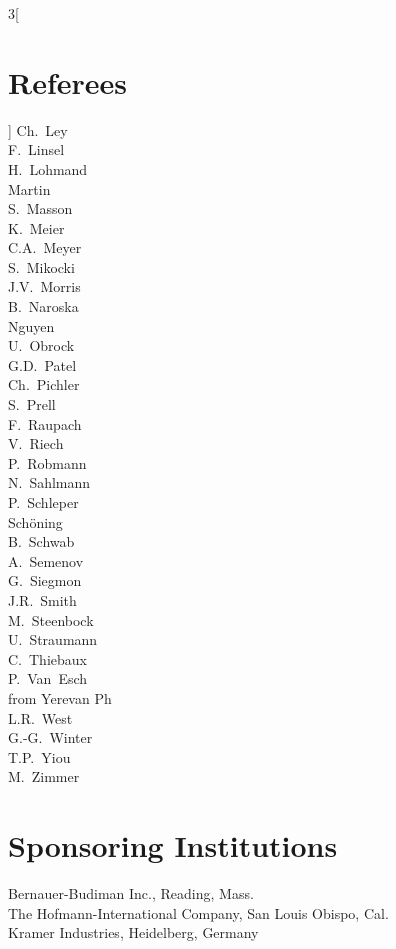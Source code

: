 \documentclass{llncs}
\begin{document}
\begin{multicols}{3}[\section*{Referees}]
Ch.~Ley\\
F.~Linsel\\
H.~Lohmand\\
Martin\\
S.~Masson\\
K.~Meier\\
C.A.~Meyer\\
S.~Mikocki\\
J.V.~Morris\\
B.~Naroska\\
Nguyen\\
U.~Obrock\\
G.D.~Patel\\
Ch.~Pichler\\
S.~Prell\\
F.~Raupach\\
V.~Riech\\
P.~Robmann\\
N.~Sahlmann\\
P.~Schleper\\
Sch\"oning\\
B.~Schwab\\
A.~Semenov\\
G.~Siegmon\\
J.R.~Smith\\
M.~Steenbock\\
U.~Straumann\\
C.~Thiebaux\\
P.~Van~Esch\\
from Yerevan Ph\\
L.R.~West\\
G.-G.~Winter\\
T.P.~Yiou\\
M.~Zimmer\end{multicols}
%
\section*{Sponsoring Institutions}
%
Bernauer-Budiman Inc., Reading, Mass.\\
The Hofmann-International Company, San Louis Obispo, Cal.\\
Kramer Industries, Heidelberg, Germany
%
\tableofcontents
%
\mainmatter              %
%











\clearpage
{} %
\renewcommand{\indexname}{Author Index}
\printindex
\clearpage
{} %
\renewcommand{\indexname}{Subject Index}

\end{document}
